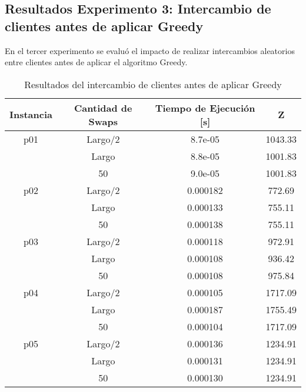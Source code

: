 \documentclass[letter, 10pt]{article}
\begin{document}
\subsection{Resultados Experimento 3: Intercambio de clientes antes de aplicar Greedy}

En el tercer experimento se evaluó el impacto de realizar intercambios aleatorios entre clientes antes de aplicar el algoritmo Greedy.

\begin{table}[H]
\centering
\begin{tabular}{|c|c|c|c|}
\hline
\textbf{Instancia} & \textbf{Cantidad de Swaps} & \textbf{Tiempo de Ejecución [s]} & \textbf{Z} \\ \hline
p01                & Largo/2                    & 8.7e-05                          & 1043.33   \\ \cline{2-4} 
                   & Largo                      & 8.8e-05                          & 1001.83   \\ \cline{2-4} 
                   & 50                         & 9.0e-05                          & 1001.83   \\ \hline
p02                & Largo/2                    & 0.000182                         & 772.69    \\ \cline{2-4} 
                   & Largo                      & 0.000133                         & 755.11    \\ \cline{2-4} 
                   & 50                         & 0.000138                         & 755.11    \\ \hline
p03                & Largo/2                    & 0.000118                         & 972.91    \\ \cline{2-4} 
                   & Largo                      & 0.000108                         & 936.42    \\ \cline{2-4} 
                   & 50                         & 0.000108                         & 975.84    \\ \hline
p04                & Largo/2                    & 0.000105                         & 1717.09   \\ \cline{2-4} 
                   & Largo                      & 0.000187                         & 1755.49   \\ \cline{2-4} 
                   & 50                         & 0.000104                         & 1717.09   \\ \hline
p05                & Largo/2                    & 0.000136                         & 1234.91   \\ \cline{2-4} 
                   & Largo                      & 0.000131                         & 1234.91   \\ \cline{2-4} 
                   & 50                         & 0.000130                         & 1234.91   \\ \hline
\end{tabular}
\caption{Resultados del intercambio de clientes antes de aplicar Greedy}
\end{table}
\end{document}
